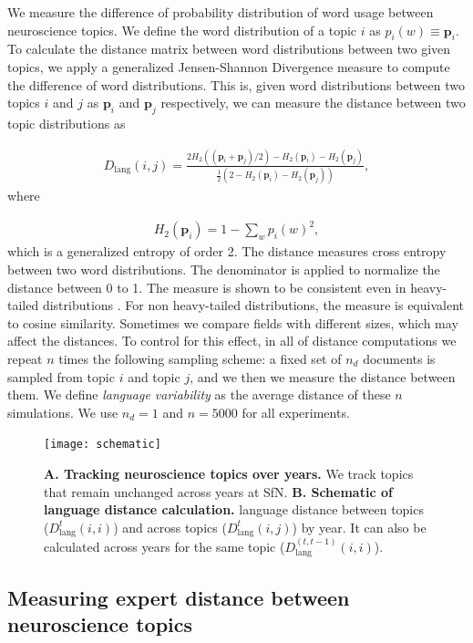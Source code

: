\documentclass[10pt,letterpaper]{article}
\begin{document}
We measure the difference of probability distribution of word usage between neuroscience topics. We define the word distribution of a topic $i$ as $p_i (w) \equiv \mathbf{p}_i$. To calculate the distance matrix between word distributions between two given topics, we apply a generalized Jensen-Shannon Divergence measure \cite{gerlach2016similarity} to compute the difference of word distributions. This is, given word distributions between two topics $i$ and $j$ as $\mathbf{p}_i$ and $\mathbf{p}_j$ respectively, we can measure the distance between two topic distributions as

\begin{align}
    D_{\text{lang}}(i, j) = \frac{2 H_2 ((\mathbf{p}_i + \mathbf{p}_j)/2) - H_2 (\mathbf{p}_i) - H_2 (\mathbf{p}_j) }{\frac{1}{2}(2 - H_2 (\mathbf{p}_i) - H_2 (\mathbf{p}_j))},
\end{align}
where

\begin{align}
    H_2 (\mathbf{p}_i) = 1 - \sum_w p_i (w)^2,
\end{align}
which is a generalized entropy of order 2. The distance measures cross entropy between two word distributions. The denominator is applied to normalize the distance between 0 to 1. The measure is shown to be consistent even in heavy-tailed distributions \cite{gerlach2016similarity}. For non heavy-tailed distributions, the measure is equivalent to cosine similarity. Sometimes we compare fields with different sizes, which may affect the distances. To control for this effect, in all of distance computations we repeat $n$ times the following sampling scheme: a fixed set of $n_d$ documents is sampled from topic $i$ and topic $j$, and we then we measure the distance between them. We define \textit{language variability} as the average distance of these $n$ simulations. We use $n_d = 1$ and $n=5000$ for all experiments.

\begin{figure}[ht]
\centering
\texttt{[image: schematic]}
\caption{\textbf{A. Tracking neuroscience topics over years.} We track topics that remain unchanged across years at SfN. \textbf{B. Schematic of language distance calculation.} language distance between topics ($D_{\text{lang}}^t (i, i)$) and across topics ($D_{\text{lang}}^t (i, j)$) by year. It can also be calculated across years for the same topic ($D_{\text{lang}}^{(t, t-1)} (i, i)$).}
\label{fig:schematic}
\end{figure}

\subsection*{Measuring expert distance between neuroscience topics}
\end{document}
